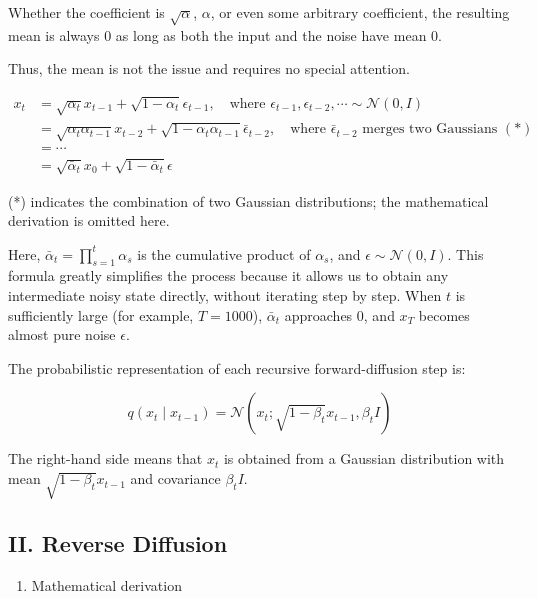 Whether the coefficient is \(\sqrt{\alpha}\), \(\alpha\), or even some arbitrary coefficient, the resulting mean is always \(0\) as long as both the input and the noise have mean \(0\).

Thus, the mean is not the issue and requires no special attention.

\[
\begin{aligned}
x_t
&= \sqrt{\alpha_t}x_{t-1} + \sqrt{1-\alpha_t}\epsilon_{t-1},
\quad \text{where } \epsilon_{t-1},\epsilon_{t-2},\cdots \sim \mathcal{N}(0,I) \\
&= \sqrt{\alpha_t\alpha_{t-1}}x_{t-2}
 + \sqrt{1-\alpha_t\alpha_{t-1}}\bar{\epsilon}_{t-2},
\quad \text{where } \bar{\epsilon}_{t-2} \text{ merges two Gaussians } (*) \\
&= \cdots \\
&= \sqrt{\bar{\alpha}_t}x_0+\sqrt{1-\bar{\alpha}_t}\epsilon
\end{aligned}
\]

(*) indicates the combination of two Gaussian distributions; the mathematical derivation is omitted here.

Here, \(\bar{\alpha}_t=\prod_{s=1}^{t}\alpha_s\) is the cumulative product of \(\alpha_s\), and \(\epsilon\sim\mathcal{N}(0,I)\). This formula greatly simplifies the process because it allows us to obtain any intermediate noisy state directly, without iterating step by step. When \(t\) is sufficiently large (for example, \(T=1000\)), \(\bar{\alpha}_t\) approaches \(0\), and \(x_T\) becomes almost pure noise \(\epsilon\).

The probabilistic representation of each recursive forward-diffusion step is:

\[
q(x_t\mid x_{t-1}) = \mathcal{N}(x_t;\sqrt{1-\beta_t}x_{t-1},\beta_t I)
\]

The right-hand side means that \(x_t\) is obtained from a Gaussian distribution with mean \(\sqrt{1-\beta_t}x_{t-1}\) and covariance \(\beta_t I\).

\hypertarget{ii.-reverse-diffusion}{%
\subsection{II. Reverse Diffusion}\label{ii.-reverse-diffusion}}

\begin{enumerate}
\def\labelenumi{\arabic{enumi}.}
\tightlist
\item
  Mathematical derivation
\end{enumerate}

